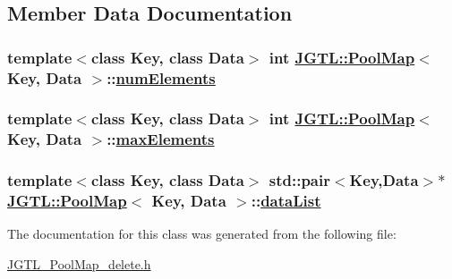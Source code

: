 \subsection{Member Data Documentation}
\hypertarget{class_j_g_t_l_1_1_pool_map_973160447230898cb7e0dd73ad675879}{
\subsubsection[numElements]{\setlength{\rightskip}{0pt plus 5cm}template$<$class Key, class Data$>$ int \hyperlink{class_j_g_t_l_1_1_pool_map}{JGTL::Pool\-Map}$<$ Key, Data $>$::\hyperlink{class_j_g_t_l_1_1_pool_map_973160447230898cb7e0dd73ad675879}{num\-Elements}}}
\label{class_j_g_t_l_1_1_pool_map_973160447230898cb7e0dd73ad675879}


\hypertarget{class_j_g_t_l_1_1_pool_map_15fff9edc5d43282b599db47bfbd31f5}{
\subsubsection[maxElements]{\setlength{\rightskip}{0pt plus 5cm}template$<$class Key, class Data$>$ int \hyperlink{class_j_g_t_l_1_1_pool_map}{JGTL::Pool\-Map}$<$ Key, Data $>$::\hyperlink{class_j_g_t_l_1_1_pool_map_15fff9edc5d43282b599db47bfbd31f5}{max\-Elements}}}
\label{class_j_g_t_l_1_1_pool_map_15fff9edc5d43282b599db47bfbd31f5}


\hypertarget{class_j_g_t_l_1_1_pool_map_0f8e82d573853a0b6bf943f277106f7f}{
\subsubsection[dataList]{\setlength{\rightskip}{0pt plus 5cm}template$<$class Key, class Data$>$ std::pair$<$Key,Data$>$$\ast$ \hyperlink{class_j_g_t_l_1_1_pool_map}{JGTL::Pool\-Map}$<$ Key, Data $>$::\hyperlink{class_j_g_t_l_1_1_pool_map_0f8e82d573853a0b6bf943f277106f7f}{data\-List}}}
\label{class_j_g_t_l_1_1_pool_map_0f8e82d573853a0b6bf943f277106f7f}




The documentation for this class was generated from the following file:\begin{CompactItemize}
\item 
\hyperlink{_j_g_t_l___pool_map__delete_8h}{JGTL\_\-Pool\-Map\_\-delete.h}\end{CompactItemize}
